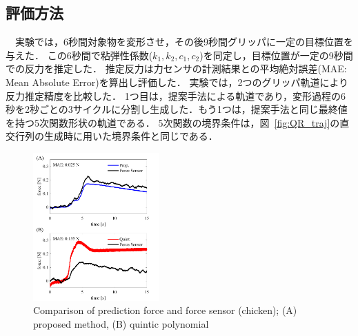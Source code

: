 \documentclass[a4paper]{jarticle}
\begin{document}
\subsection{評価方法}
　実験では，6秒間対象物を変形させ，その後9秒間グリッパに一定の目標位置を与えた．
この6秒間で粘弾性係数($k_1, k_2, c_1, c_2$)を同定し，目標位置が一定の9秒間での反力を推定した．
推定反力は力センサの計測結果との平均絶対誤差(MAE: Mean Absolute Error)を算出し評価した．
実験では，2つのグリッパ軌道により反力推定精度を比較した．
1つ目は，提案手法による軌道であり，変形過程の6秒を2秒ごとの3サイクルに分割し生成した．もう1つは，提案手法と同じ最終値を持つ5次関数形状の軌道である．
5次関数の境界条件は，図~{\ref{fig:QR_traj}}の直交行列の生成時に用いた境界条件と同じである．
\begin{figure}[tb]
    \centering
    \includegraphics[width=0.43\textwidth]{prop_quint.pdf}
    \captionsetup{width=0.9\linewidth} %
    \caption{Comparison of prediction force and force sensor (chicken); (A) proposed method, (B) quintic polynomial}
    \label{fig:prop_quint}
\end{figure}
\end{document}
